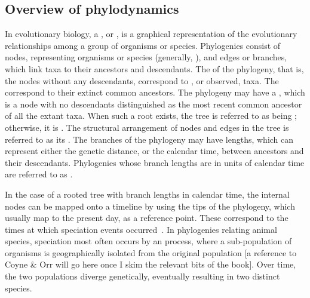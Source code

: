 \subsection{Overview of phylodynamics}

In evolutionary biology, a , or , is a
graphical representation of the evolutionary relationships among a group of
organisms or species. Phylogenies consist of nodes, representing organisms or
species (generally, ), and edges or branches, which link taxa to
their ancestors and descendants. The  of the phylogeny, that is, the
nodes without any descendants, correspond to , or observed, taxa.
The  correspond to their extinct common ancestors. The
phylogeny may have a , which is a node with no descendants
distinguished as the most recent common ancestor of all the extant taxa. When
such a root exists, the tree is referred to as being ; otherwise,
it is . The structural arrangement of nodes and edges in the
tree is referred to as its . The branches of the phylogeny may
have lengths, which can represent either the genetic distance, or the calendar
time, between ancestors and their descendants. Phylogenies whose branch lengths
are in units of calendar time are referred to as .

In the case of a rooted tree with branch lengths in calendar time, the internal
nodes can be mapped onto a timeline by using the tips of the phylogeny, which
usually map to the present day, as a reference point. These  correspond to the times at which speciation events
occurred~\autocite{nee1992tempo}. In phylogenies relating animal species,
speciation most often occurs by an  process, where a
sub-population of organisms is geographically isolated from the original
population [a reference to Coyne \& Orr will go here once I skim the relevant
bits of the book]. Over time, the two populations diverge genetically,
eventually resulting in two distinct species.

